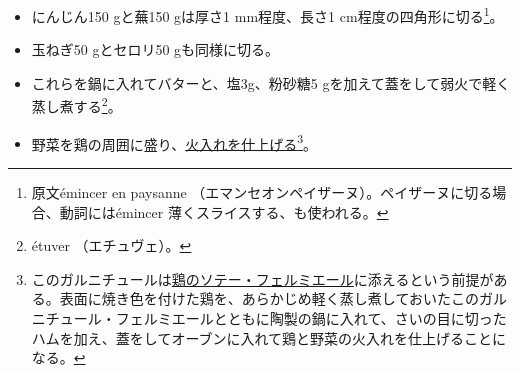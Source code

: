 \begin{recette}
\begin{itemize}
\item
  にんじん150 gと蕪150 gは厚さ1 mm程度、長さ1
  cm程度の四角形に切る\footnote{原文émincer en paysanne
    （エマンセオンペイザーヌ）。ペイザーヌに切る場合、動詞にはémincer
    薄くスライスする、も使われる。}。
\item
  玉ねぎ50 gとセロリ50 gも同様に切る。
\item
  これらを鍋に入れてバターと、塩3g、粉砂糖5
  gを加えて蓋をして弱火で軽く蒸し煮する\footnote{étuver （エチュヴェ）。}。
\item
  野菜を鶏の周囲に盛り、\ul{火入れを仕上げる}\footnote{このガルニチュールは\protect\hyperlink{poulet-saute-fermiere}{鶏のソテー・フェルミエール}に添えるという前提がある。表面に焼き色を付けた鶏を、あらかじめ軽く蒸し煮しておいたこのガルニチュール・フェルミエールとともに陶製の鍋に入れて、さいの目に切ったハムを加え、蓋をしてオーブンに入れて鶏と野菜の火入れを仕上げることになる。}。
\end{itemize}

\atoaki{}

\hypertarget{garniture-financiere}{%
}
\end{recette}
